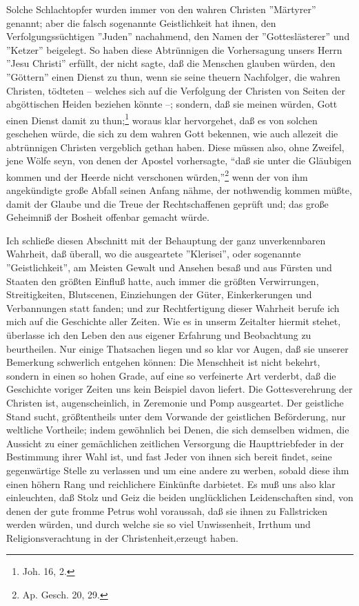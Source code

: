 Solche Schlachtopfer wurden immer von den wahren Christen ''Märtyrer'' genannt; aber die falsch sogenannte Geistlichkeit hat ihnen, den Verfolgungssüchtigen ''Juden'' nachahmend, den Namen der ''Gotteslästerer'' und ''Ketzer'' beigelegt. So haben diese Abtrünnigen die Vorhersagung unsers Herrn ''Jesu Christi'' erfüllt, der nicht sagte, daß die Menschen glauben würden, den ''Göttern'' einen Dienst zu thun, wenn sie seine theuern Nachfolger, die wahren Christen, tödteten -- welches sich auf die Verfolgung der Christen von Seiten der abgöttischen Heiden beziehen könnte --; sondern, daß sie meinen würden, Gott einen Dienst damit zu thun;\footnote{Joh. 16, 2.} woraus klar hervorgehet, daß es von solchen geschehen würde, die sich zu dem wahren Gott bekennen, wie auch allezeit die abtrünnigen Christen vergeblich gethan haben. Diese müssen also, ohne Zweifel, jene Wölfe seyn, von denen der Apostel vorhersagte, "`daß sie unter die Gläubigen kommen und der Heerde nicht verschonen würden,"'\footnote{Ap. Gesch. 20, 29.} wenn der von ihm angekündigte große Abfall seinen Anfang nähme, der nothwendig kommen müßte, damit der Glaube und die Treue der Rechtschaffenen geprüft und; das große Geheimniß der Bosheit offenbar gemacht würde.

Ich schließe diesen Abschnitt mit der Behauptung der ganz unverkennbaren Wahrheit, daß überall, wo die ausgeartete ''Klerisei'', oder sogenannte ''Geistlichkeit'', am Meisten Gewalt und Ansehen besaß und aus Fürsten und Staaten den größten Einfluß hatte, auch immer die größten Verwirrungen, Streitigkeiten, Blutscenen, Einziehungen der Güter, Einkerkerungen und Verbannungen statt fanden; und zur Rechtfertigung dieser Wahrheit berufe ich mich auf die Geschichte aller Zeiten. Wie es in unserm Zeitalter hiermit stehet, überlasse ich den Leben den aus eigener Erfahrung und Beobachtung zu beurtheilen. Nur einige Thatsachen liegen und so klar vor Augen, daß sie unserer Bemerkung schwerlich entgehen können: Die Menschheit ist nicht bekehrt, sondern in einen so hohen Grade, auf eine so verfeinerte Art verderbt, daß die Geschichte voriger Zeiten uns kein Beispiel davon liefert. Die Gottesverehrung der Christen ist, augenscheinlich, in Zeremonie und Pomp ausgeartet. Der geistliche Stand sucht, größtentheils unter dem Vorwande der geistlichen Beförderung, nur weltliche Vortheile; indem gewöhnlich bei Denen, die sich demselben widmen, die Aussicht zu einer gemächlichen zeitlichen Versorgung die Haupttriebfeder in der Bestimmung ihrer Wahl ist, und fast Jeder von ihnen sich bereit findet, seine gegenwärtige Stelle zu verlassen und um eine andere zu werben, sobald diese ihm einen höhern Rang und reichlichere Einkünfte darbietet. Es muß uns also klar einleuchten, daß Stolz und Geiz die beiden unglücklichen Leidenschaften sind, von denen der gute fromme Petrus wohl voraussah, daß sie ihnen zu Fallstricken werden würden, und durch welche sie so viel Unwissenheit, Irrthum und Religionsverachtung in der Christenheit,erzeugt haben.

